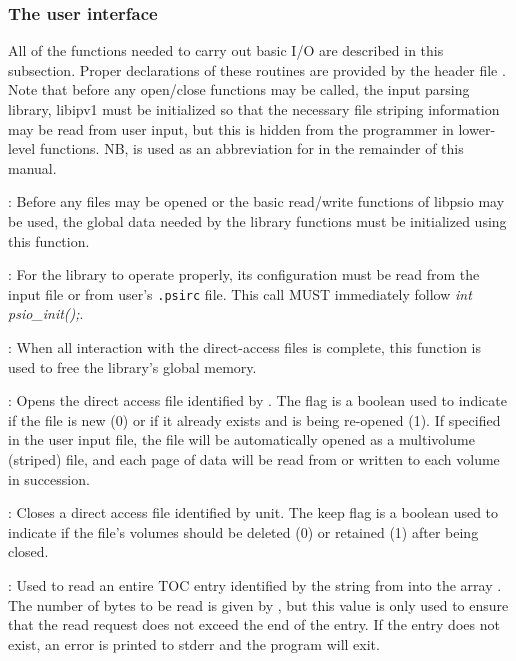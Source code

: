 \subsubsection{The user interface}
All of the functions needed to carry out basic I/O are described in
this subsection. Proper declarations of these routines are provided by
the header file . Note that before any open/close
functions may be called, the input parsing library, libipv1 must be
initialized so that the necessary file striping information may be
read from user input, but this is hidden from the programmer in
lower-level functions.  NB,  is used as an abbreviation for
 in the remainder of this manual.

: Before any files may be opened or the
basic read/write functions of libpsio may be used, the global data
needed by the library functions must be initialized using this
function.

: For the library to operate properly,
its configuration must be read from the input file or from user's {\tt .psirc} file.
This call MUST immediately follow {\em int psio\_init();}.

: When all interaction with the
direct-access files is complete, this function is used to free the
library's global memory.

: Opens the direct access
file identified by . The  flag is a boolean
used to indicate if the file is new (0) or if it already exists and is
being re-opened (1). If specified in the user input file, the file
will be automatically opened as a multivolume (striped) file, and each
page of data will be read from or written to each volume in
succession.

: Closes a direct access
file identified by unit. The keep flag is a boolean used to indicate
if the file's volumes should be deleted (0) or retained (1) after
being closed.

: Used to read an entire TOC entry identified by the string
 from  into the array . The
number of bytes to be read is given by , but this value is
only used to ensure that the read request does not exceed the end of
the entry. If the entry does not exist, an error is printed to stderr
and the program will exit.

